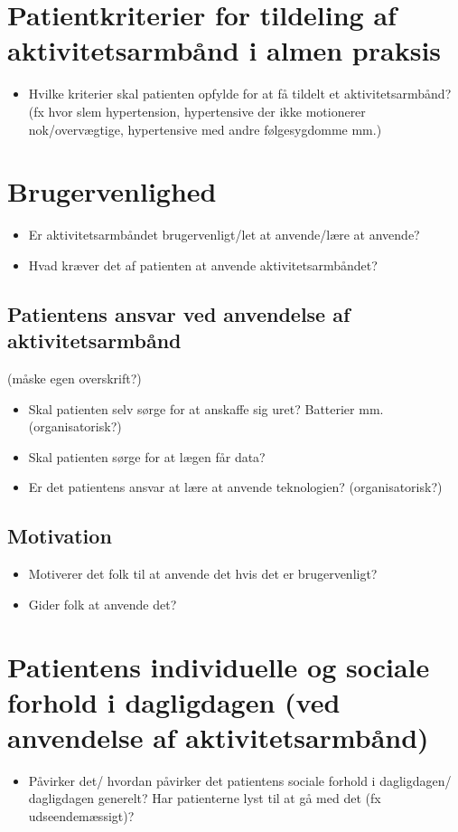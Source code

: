 \section{Patientkriterier for tildeling af aktivitetsarmbånd i almen praksis}
\begin{itemize}
\item Hvilke kriterier skal patienten opfylde for at få tildelt et aktivitetsarmbånd? (fx hvor slem hypertension, hypertensive der ikke motionerer nok/overvægtige, hypertensive med andre følgesygdomme mm.)
\end{itemize}

\section{Brugervenlighed}
\begin{itemize}
\item Er aktivitetsarmbåndet brugervenligt/let at anvende/lære at anvende?
\item Hvad kræver det af patienten at anvende aktivitetsarmbåndet?
\end{itemize}

\subsection{Patientens ansvar ved anvendelse af aktivitetsarmbånd} (måske egen overskrift?)
\begin{itemize}
\item Skal patienten selv sørge for at anskaffe sig uret? Batterier mm. (organisatorisk?)
\item Skal patienten sørge for at lægen får data?
\item Er det patientens ansvar at lære at anvende teknologien? (organisatorisk?)
\end{itemize}

\subsection{Motivation}
\begin{itemize}
\item Motiverer det folk til at anvende det hvis det er brugervenligt?
\item Gider folk at anvende det?
\end{itemize}

\section{Patientens individuelle og sociale forhold i dagligdagen (ved anvendelse af aktivitetsarmbånd)}
\begin{itemize}
\item Påvirker det/ hvordan påvirker det patientens sociale forhold i dagligdagen/ dagligdagen generelt? Har patienterne lyst til at gå med det (fx udseendemæssigt)?
\end{itemize}

